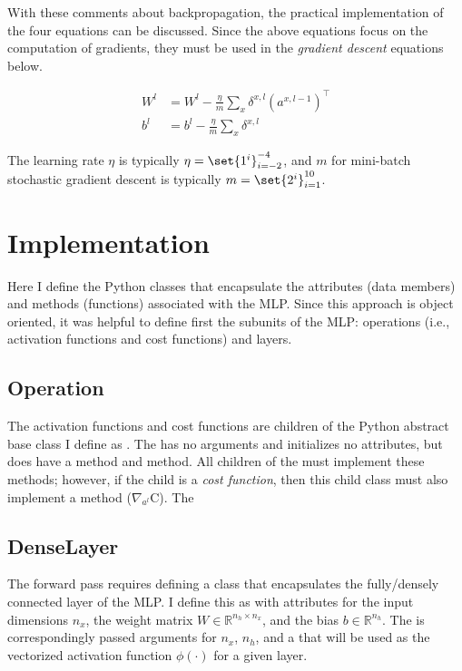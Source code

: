 \documentclass{article}
\DeclarePairedDelimiter\set\{\}
\begin{document}
With these comments about backpropagation,
the practical implementation of the four equations can be discussed.
Since the above equations focus on the computation of gradients,
they must be used in the \textit{gradient descent} equations below.

\begin{align}
	W^{l} & = W^{l} - \frac{\eta}{m} \sum_{x}{\delta^{x, l}(a^{x, l-1})^\top} \\
	b^{l} & = b^{l} - \frac{\eta}{m} \sum_{x}{\delta^{x, l}}
\end{align}

The learning rate $\eta$ is typically $\eta = \set{1^{i}}_{i=-2}^{-4}$, and $m$
for mini-batch stochastic gradient descent is typically
$m = \set{2^{i}}_{i=1}^{10}$.

\section{Implementation}

\quad Here I define the Python classes
that encapsulate the attributes (data members) and methods (functions) associated
with the MLP. Since this approach is object oriented, it was helpful to
define first the subunits of the MLP: operations (i.e., activation functions and
cost functions) and layers.

\subsection{Operation}

\quad The activation functions and cost functions are children of the Python
abstract base class I define as . The
 has no arguments and initializes no attributes, but
does have a  method and  method. All
children of the  must implement these methods; however, if
the child is a \textit{cost function}, then this child class must also
implement a  method ($\nabla_{a^{l}}\text{C}$). The

\subsection{DenseLayer}

\quad The forward pass requires defining a class that
encapsulates the fully/densely connected layer of the MLP. I define this as
 with attributes for the input dimensions $n_x$,
the weight matrix $W \in \mathbb{R}^{n_h \times n_x}$, and the bias
${b \in \mathbb{R}^{n_h}}$. The  is correspondingly passed
arguments for $n_x$, $n_h$, and a 
that will be used as the vectorized activation function $\phi(\cdot)$ for a given layer.
\end{document}
